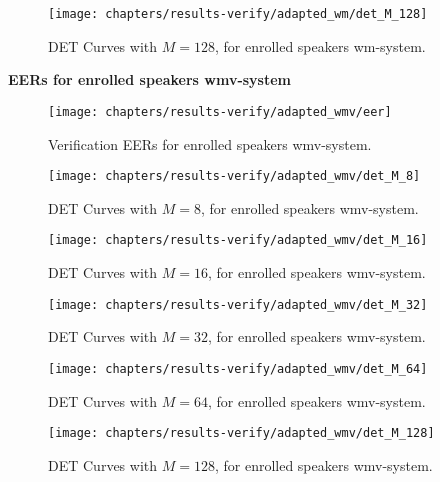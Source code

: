 \clearpage
\begin{figure}[ht]
	\centering
	\texttt{[image: chapters/results-verify/adapted\_wm/det\_M\_128]}
	\caption{DET Curves with $M = 128$, for enrolled speakers wm-system.}
	\label{fig:results-verify-adapted_wm-M_128}
\end{figure}

\newpage
\noindent \textbf{EERs for enrolled speakers wmv-system}



\begin{figure}[ht]
	\centering
	\texttt{[image: chapters/results-verify/adapted\_wmv/eer]}
	\caption{Verification EERs for enrolled speakers  wmv-system.}
	\label{fig:results-verify-adapted_wmv}
\end{figure}

\begin{figure}[ht]
	\centering
	\texttt{[image: chapters/results-verify/adapted\_wmv/det\_M\_8]}
	\caption{DET Curves with $M = 8$, for enrolled speakers wmv-system.}
	\label{fig:results-verify-adapted_wmv-M_8}
\end{figure}

\begin{figure}[ht]
	\centering
	\texttt{[image: chapters/results-verify/adapted\_wmv/det\_M\_16]}
	\caption{DET Curves with $M = 16$, for enrolled speakers wmv-system.}
	\label{fig:results-verify-adapted_wmv-M_16}
\end{figure}

\begin{figure}[ht]
	\centering
	\texttt{[image: chapters/results-verify/adapted\_wmv/det\_M\_32]}
	\caption{DET Curves with $M = 32$, for enrolled speakers wmv-system.}
	\label{fig:results-verify-adapted_wmv-M_32}
\end{figure}

\begin{figure}[ht]
	\centering
	\texttt{[image: chapters/results-verify/adapted\_wmv/det\_M\_64]}
	\caption{DET Curves with $M = 64$, for enrolled speakers wmv-system.}
	\label{fig:results-verify-adapted_wmv-M_64}
\end{figure}

\clearpage
\begin{figure}[ht]
	\centering
	\texttt{[image: chapters/results-verify/adapted\_wmv/det\_M\_128]}
	\caption{DET Curves with $M = 128$, for enrolled speakers wmv-system.}
	\label{fig:results-verify-adapted_wmv-M_128}
\end{figure}
